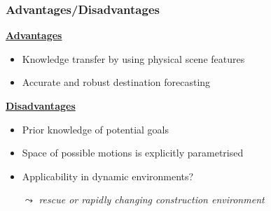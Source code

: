 \begin{frame}
	\frametitle{Advantages/Disadvantages}
	
	\Large
	
	\vspace{0.4cm}
	
	\underline{\textbf{Advantages}} \\
	
	\vspace{0.2cm}
	
	\begin{itemize}
		\item Knowledge transfer by using physical scene features
		\item Accurate and robust destination forecasting
	\end{itemize}
	
	\vspace{0.2cm}
	
	\underline{\textbf{Disadvantages}} \\
	
	\vspace{0.19cm}
	
	\begin{itemize}
		\item Prior knowledge of potential goals
		\item Space of possible motions is explicitly parametrised
		\item Applicability in dynamic environments? \\
			  \vspace{-0.2cm}
			  \begin{tabbing}
				  \hspace{0.3cm}
				  \large
				  $ \leadsto $ \emph{rescue or rapidly changing construction environment}
			  \end{tabbing}
	\end{itemize}
\end{frame}
